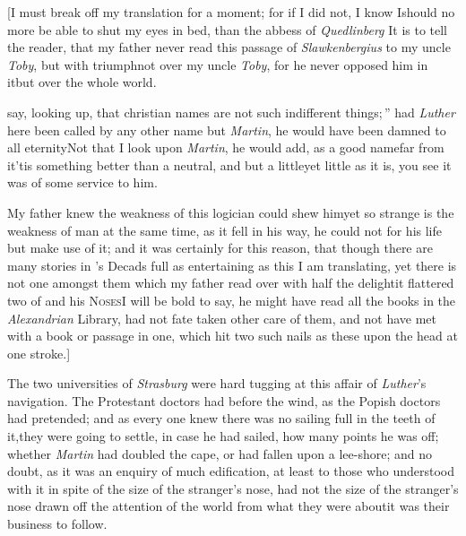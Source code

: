 \documentclass{article}
\begin{document}
[\tsh I must break off my translation for a moment; for if I
did not, I know I\break should no more be able to shut my
eyes in bed, than the abbess of \textit{Quedlinberg}\tsk\break
It is to tell the reader, that my father never read this
passage of \textit{Slawkenbergius} to my uncle
\textit{Toby}, but with triumph\tsk not over my uncle
\textit{Toby}, for he never opposed him in it\tsk but over
the whole world.

\noindent
{}
say, looking up, \lqq that christian names\break
\lqq are not such indifferent things;\,”\tsk\break
had \textit{Luther} here been called by any other name but
\textit{Martin}, he would have been damned to all
eternity\tsk Not that I look upon \textit{Martin}, he would
add, as a good
name\tsk far from it\tsk ’tis something better than a
neutral, and but a little\tsk yet little as it is, you see it
was of some service to him.

My father knew the weakness of this
logician could shew him\tsk yet so
strange is the weakness of man at the same time, as it fell in his
way, he could not for his life but make use of it; and it was
certainly for this reason, that though there are many stories in
’s Decads full as entertaining as
this I am translating, yet there is not one amongst them which my
father read over with half the delight\tsk it flattered
two of  and his \textsc{Noses}\tsk I
will be bold to say, he might have read all the books in the
\textit{Alexandrian} Library, had not fate taken other care of them,
and not have met with a book or passage in one, which hit two such
nails as these upon the head at one stroke.]

The two universities of \textit{Strasburg} were hard tugging at
this affair of \textit{Luther}’s navigation. The Protestant
doctors had\break 
{}
before the
wind, as the Popish doctors had pretended; and as every one knew
there was no sailing full in the teeth of it,\tsk they were going
to settle, in case he had sailed, how many points he was off;
whether \textit{Martin} had doubled the cape, or had fallen upon a
lee-shore; and no doubt, as it was an enquiry of much edi\-fication,
at least to those who understood\break
{} 
with it in spite of the
size of the stranger’s nose, had not the size of the
stranger’s nose drawn off the attention of the world from
what they were about\tsk it was their business to
follow.\tsh
\end{document}
